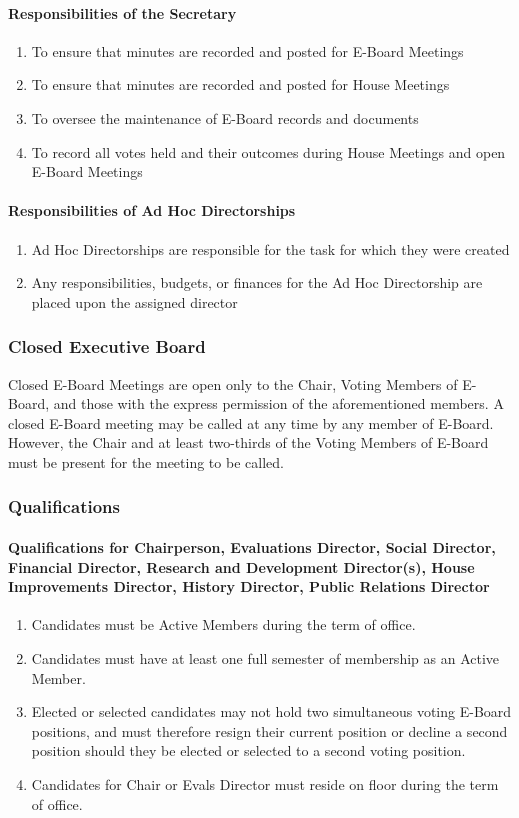 \documentclass{article}
\newcommand{\asubsection}[1]{\subsubsection{#1} \label{#1}}
\newcommand{\asubsubsection}[1]{\paragraph{#1} \label{#1}}
\begin{document}
\asubsubsection{Responsibilities of the Secretary}
\begin{enumerate}
	\item To ensure that minutes are recorded and posted for E-Board Meetings
	\item To ensure that minutes are recorded and posted for House Meetings
	\item To oversee the maintenance of E-Board records and documents
	\item To record all votes held and their outcomes during House Meetings and open E-Board Meetings
\end{enumerate}

\asubsubsection{Responsibilities of Ad Hoc Directorships}
\begin{enumerate}
	\item Ad Hoc Directorships are responsible for the task for which they were created
	\item Any responsibilities, budgets, or finances for the Ad Hoc Directorship are placed upon the assigned director
\end{enumerate}

\asubsection{Closed Executive Board}
Closed E-Board Meetings are open only to the Chair, Voting Members of E-Board, and those with the express permission of the aforementioned members.
A closed E-Board meeting may be called at any time by any member of E-Board.
However, the Chair and at least two-thirds of the Voting Members of E-Board must be present for the meeting to be called.

\asubsection{Qualifications}

\asubsubsection{Qualifications for Chairperson, Evaluations Director, Social Director, Financial Director, Research and Development Director(s), House Improvements Director, History Director, Public Relations Director}
\begin{enumerate}
	\item Candidates must be Active Members during the term of office.
	\item Candidates must have at least one full semester of membership as an Active Member.
	\item Elected or selected candidates may not hold two simultaneous voting E-Board positions, and must therefore resign their current position or decline a second position should they be elected or selected to a second voting position.
	\item Candidates for Chair or Evals Director must reside on floor during the term of office.
\end{enumerate}
\end{document}
